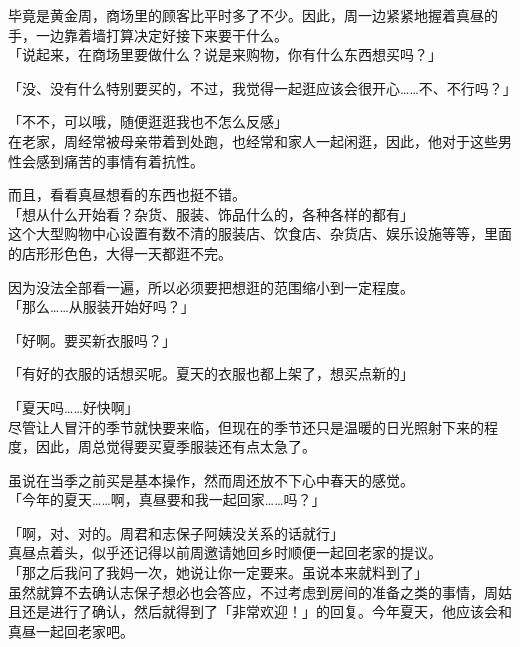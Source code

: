 毕竟是黄金周，商场里的顾客比平时多了不少。因此，周一边紧紧地握着真昼的手，一边靠着墙打算决定好接下来要干什么。\\

「说起来，在商场里要做什么？说是来购物，你有什么东西想买吗？」

「没、没有什么特别要买的，不过，我觉得一起逛应该会很开心……不、不行吗？」

「不不，可以哦，随便逛逛我也不怎么反感」\\

在老家，周经常被母亲带着到处跑，也经常和家人一起闲逛，因此，他对于这些男性会感到痛苦的事情有着抗性。

而且，看看真昼想看的东西也挺不错。\\

「想从什么开始看？杂货、服装、饰品什么的，各种各样的都有」\\

这个大型购物中心设置有数不清的服装店、饮食店、杂货店、娱乐设施等等，里面的店形形色色，大得一天都逛不完。

因为没法全部看一遍，所以必须要把想逛的范围缩小到一定程度。\\

「那么……从服装开始好吗？」

「好啊。要买新衣服吗？」

「有好的衣服的话想买呢。夏天的衣服也都上架了，想买点新的」

「夏天吗……好快啊」\\

尽管让人冒汗的季节就快要来临，但现在的季节还只是温暖的日光照射下来的程度，因此，周总觉得要买夏季服装还有点太急了。

虽说在当季之前买是基本操作，然而周还放不下心中春天的感觉。\\

「今年的夏天……啊，真昼要和我一起回家……吗？」

「啊，对、对的。周君和志保子阿姨没关系的话就行」\\

真昼点着头，似乎还记得以前周邀请她回乡时顺便一起回老家的提议。\\

「那之后我问了我妈一次，她说让你一定要来。虽说本来就料到了」\\

虽然就算不去确认志保子想必也会答应，不过考虑到房间的准备之类的事情，周姑且还是进行了确认，然后就得到了「非常欢迎！」的回复。今年夏天，他应该会和真昼一起回老家吧。\\


